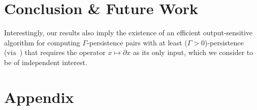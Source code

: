 \documentclass[10pt]{article}
\numberwithin{equation}{section}
\newcommand{\+}{%
	\raisebox{0.18ex}{\scaleobj{0.55}{+}}
}
\DeclareMathOperator*{\argmax}{arg\,max}
\theoremstyle{definition}
\theoremstyle{definition}
\begin{document}
\section{Conclusion \& Future Work}
Interestingly, our results also imply the existence of an efficient output-sensitive algorithm for computing $\Gamma$-persistence pairs with at least ($\Gamma >0$)-persistence (via~\cite{chen2011output}) that requires the operator $x \mapsto \partial x$ as its only input, which we consider to be of independent interest. 




  



\newpage 
\shipout\null

\appendix
\section{Appendix}
\end{document}
